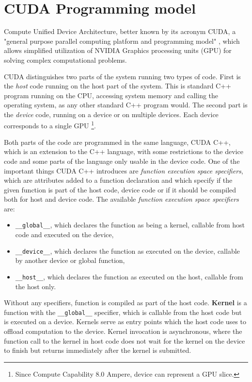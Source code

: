 

\section{CUDA Programming model}
\label{sec:programming_model}

Compute Unified Device Architecture, better known by its acronym CUDA, a "general purpose parallel computing platform and programming model" \citep{site:cuda}, which allows simplified utilization of NVIDIA Graphics processing units (GPU) for solving complex computational problems.

CUDA distinguishes two parts of the system running two types of code. First is the \textit{host} code running on the host part of the system. This is standard C++ program running on the CPU, accessing system memory and calling the operating system, as any other standard C++ program would. The second part is the \textit{device} code, running on a device or on multiple devices. Each device corresponds to a single GPU \footnote{Since Compute Capability 8.0 Ampere, device can represent a GPU slice.}.

Both parts of the code are programmed in the same language, CUDA C++, which is an extension to the C++ language, with some restrictions to the device code and some parts of the language only usable in the device code.
One of the important things CUDA C++ introduces are \textit{function execution space specifiers}, which are attributes added to a function declaration and which specify if the given function is part of the host code, device code or if it should be compiled both for host and device code. The available \textit{function execution space specifiers} are:
\begin{itemize}
	\item \texttt{\_\_global\_\_}, which declares the function as being a kernel, callable from host code and executed on the device,
	\item \texttt{\_\_device\_\_}, which declares the function as executed on the device, callable by another device or global function,
	\item \texttt{\_\_host\_\_}, which declares the function as executed on the host, callable from the host only.
\end{itemize}

Without any specifiers, function is compiled as part of the host code. \textbf{Kernel} is a function with the \texttt{\_\_global\_\_} specifier, which is callable from the host code but is executed on a device. Kernels serve as entry points which the host code uses to offload computation to the device. Kernel invocation is asynchronous, where the function call to the kernel in host code does not wait for the kernel on the device to finish but returns immediately after the kernel is submitted.

